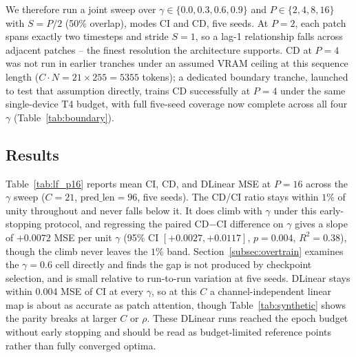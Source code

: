 \documentclass[10pt]{article} %
\begin{document}
    We therefore run a joint sweep over $\gamma \in \{0.0, 0.3, 0.6, 0.9\}$ and $P \in \{2, 4, 8, 16\}$ with $S = P/2$
    (50\% overlap), modes CI and CD, five seeds. At $P = 2$, each patch spans exactly two timesteps and stride $S = 1$, so
    a lag-1 relationship falls across adjacent patches -- the finest resolution the architecture supports. CD at $P = 4$
    was not run in earlier tranches under an assumed VRAM ceiling at this sequence length ($C \cdot N = 21 \times 255 = 5355$
    tokens); a dedicated boundary tranche, launched to test that assumption directly, trains CD successfully at $P = 4$ under
    the same single-device T4 budget, with full five-seed coverage now complete across all four $\gamma$ (Table~\ref{tab:boundary}).

    \subsection{Results}

    Table~\ref{tab:lf_p16} reports mean CI, CD, and DLinear MSE at $P = 16$ across the $\gamma$ sweep ($C = 21$,
    $\text{pred\_len} = 96$, five seeds). The CD/CI ratio stays within $1\%$ of unity throughout and never falls below it.
    It does climb with $\gamma$ under this early-stopping protocol, and regressing the paired CD$-$CI difference on $\gamma$
    gives a slope of $+0.0072$ MSE per unit $\gamma$ (95\% CI $[+0.0027, +0.0117]$, $p = 0.004$, $R^2 = 0.38$), though the
    climb never leaves the $1\%$ band. Section~\ref{subsec:overtrain} examines the $\gamma = 0.6$ cell directly and finds
    the gap is not produced by checkpoint selection, and is small relative to run-to-run variation at five seeds. DLinear
    stays within 0.004 MSE of CI at every $\gamma$, so at this $C$ a channel-independent linear map is about as accurate
    as patch attention, though Table~\ref{tab:synthetic} shows the parity breaks at larger $C$ or $\rho$. These DLinear
    runs reached the epoch budget without early stopping and should be read as budget-limited reference points rather than
    fully converged optima.
\end{document}

